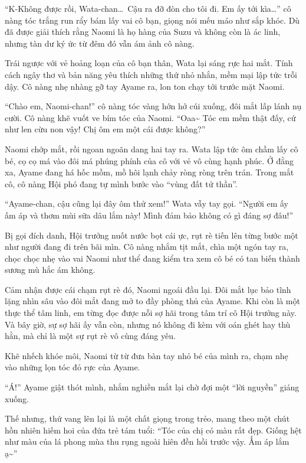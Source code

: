 \documentclass[../main.tex]{subfiles}
\begin{document}
``K-Không được rồi, Wata-chan\dots\ Cậu ra đỡ đòn cho tôi đi. Em ấy tới kìa\dots'' cô nàng tóc trắng run rẩy bám lấy vai cô bạn, giọng nói mếu máo như sắp khóc. Dù đã được giải thích rằng Naomi là họ hàng của Suzu và không còn là ác linh, nhưng tàn dư ký ức từ đêm đó vẫn ám ảnh cô nàng.

Trái ngược với vẻ hoảng loạn của cô bạn thân, Wata lại sáng rực hai mắt. Tính cách ngây thơ và bản năng yêu thích những thứ nhỏ nhắn, mềm mại lập tức trỗi dậy. Cô nàng nhẹ nhàng gỡ tay Ayame ra, lon ton chạy tới trước mặt Naomi.

``Chào em, Naomi-chan!'' cô nàng tóc vàng hớn hở cúi xuống, đôi mắt lấp lánh nụ cười. Cô nàng khẽ vuốt ve bím tóc của Naomi. ``Oaa\~{} Tóc em mềm thật đấy, cứ như len cừu non vậy! Chị ôm em một cái được không?''

Naomi chớp mắt, rồi ngoan ngoãn dang hai tay ra. Wata lập tức ôm chầm lấy cô bé, cọ cọ má vào đôi má phúng phính của cô với vẻ vô cùng hạnh phúc. Ở đằng xa, Ayame đang há hốc mồm, mồ hôi lạnh chảy ròng ròng trên trán. Trong mắt cô, cô nàng Hội phó đang tự mình bước vào ``vùng đất tử thần''.

``Ayame-chan, cậu cũng lại đây ôm thử xem!'' Wata vẫy tay gọi. ``Người em ấy ấm áp và thơm mùi sữa dâu lắm này! Mình đảm bảo không có gì đáng sợ đâu!''

Bị gọi đích danh, Hội trưởng nuốt nước bọt cái ực, rụt rè tiến lên từng bước một như người đang đi trên bãi mìn. Cô nàng nhắm tịt mắt, chìa một ngón tay ra, chọc chọc nhẹ vào vai Naomi như thể đang kiểm tra xem cô bé có tan biến thành sương mù hắc ám không.

Cảm nhận được cái chạm rụt rè đó, Naomi ngoái đầu lại. Đôi mắt lục bảo tĩnh lặng nhìn sâu vào đôi mắt đang mở to đầy phòng thủ của Ayame. Khi còn là một thực thể tâm linh, em từng đọc được nỗi sợ hãi trong tâm trí cô Hội trưởng này. Và bây giờ, sự sợ hãi ấy vẫn còn, nhưng nó không đi kèm với oán ghét hay thù hằn, mà chỉ là một sự rụt rè vô cùng đáng yêu.

Khẽ nhếch khóe môi, Naomi từ từ đưa bàn tay nhỏ bé của mình ra, chạm nhẹ vào những lọn tóc đỏ rực của Ayame.

``Á!'' Ayame giật thót mình, nhắm nghiền mắt lại chờ đợi một ``lời nguyền'' giáng xuống.

Thế nhưng, thứ vang lên lại là một chất giọng trong trẻo, mang theo một chút hồn nhiên hiếm hoi của đứa trẻ tám tuổi: ``Tóc của chị có màu rất đẹp. Giống hệt như màu của lá phong mùa thu rụng ngoài hiên đền hồi trước vậy. Ấm áp lắm ạ\~{}''
\end{document}
